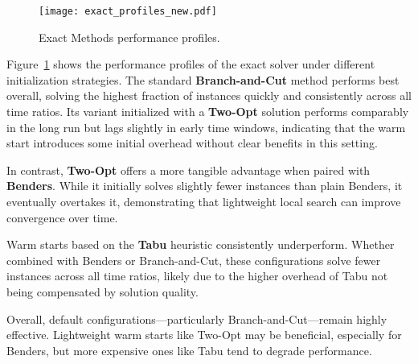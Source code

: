\begin{figure}[H]
  \centering
  \texttt{[image: exact\_profiles\_new.pdf]}
  \caption{Exact Methods performance profiles.}
  \label{fig:exact}
\end{figure}

Figure~\ref{fig:exact} shows the performance profiles of the exact solver under different initialization strategies. The standard \textbf{Branch-and-Cut} method performs best overall, solving the highest fraction of instances quickly and consistently across all time ratios. Its variant initialized with a \textbf{Two-Opt} solution performs comparably in the long run but lags slightly in early time windows, indicating that the warm start introduces some initial overhead without clear benefits in this setting.

In contrast, \textbf{Two-Opt} offers a more tangible advantage when paired with \textbf{Benders}. While it initially solves slightly fewer instances than plain Benders, it eventually overtakes it, demonstrating that lightweight local search can improve convergence over time.

Warm starts based on the \textbf{Tabu} heuristic consistently underperform. Whether combined with Benders or Branch-and-Cut, these configurations solve fewer instances across all time ratios, likely due to the higher overhead of Tabu not being compensated by solution quality.

Overall, default configurations—particularly Branch-and-Cut—remain highly effective. Lightweight warm starts like Two-Opt may be beneficial, especially for Benders, but more expensive ones like Tabu tend to degrade performance.
